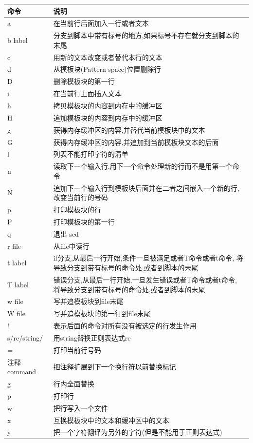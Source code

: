 \begin{tabular}{lp{25em}}
\toprule
命令       & 说明 \\
\midrule
a          & 在当前行后面加入一行或者文本 \\
b label    & 分支到脚本中带有标号的地方,如果标号不存在就分支到脚本的末尾 \\
c          & 用新的文本改变或者替代本行的文本 \\
d          & 从模板块(Pattern space)位置删除行 \\
D          & 删除模板块的第一行 \\
i          & 在当前行上面插入文本 \\
h          & 拷贝模板块的内容到内存中的缓冲区 \\
H          & 追加模板块的内容到内存中的缓冲区 \\
g          & 获得内存缓冲区的内容,并替代当前模板块中的文本 \\
G          & 获得内存缓冲区的内容,并追加到当前模板块文本的后面 \\
l          & 列表不能打印字符的清单 \\
n          & 读取下一个输入行,用下一个命令处理新的行而不是用第一个命令 \\
N          & 追加下一个输入行到模板块后面并在二者之间嵌入一个新的行,改变当前行的号码 \\
p          & 打印模板块的行 \\
P          & 打印模板块的第一行 \\
q          & 退出 sed \\
r file     & 从file中读行 \\
t label    & if分支,从最后一行开始,条件一旦被满足或者T命令或者t命令, 将导致分支到带有标号的命令处,或者到脚本的末尾 \\
T label    & 错误分支,从最后一行开始,一旦发生错误或者T命令或者t命令, 将导致分支到带有标号的命令处,或者到脚本的末尾 \\
w file     & 写并追模板块到file末尾 \\
W file     & 写并追模板块的第一行到file末尾 \\
!          & 表示后面的命令对所有没有被选定的行发生作用 \\
s/re/string/ & 用string替换正则表达式re \\
=          & 打印当前行号码 \\
注释command & 把注释扩展到下一个换行符以前替换标记 \\
g           & 行内全面替换 \\
p           & 打印行 \\
w           & 把行写入一个文件 \\
x           & 互换模板块中的文本和缓冲区中的文本 \\
y           & 把一个字符翻译为另外的字符(但是不能用于正则表达式) \\
\bottomrule
\end{tabular}

